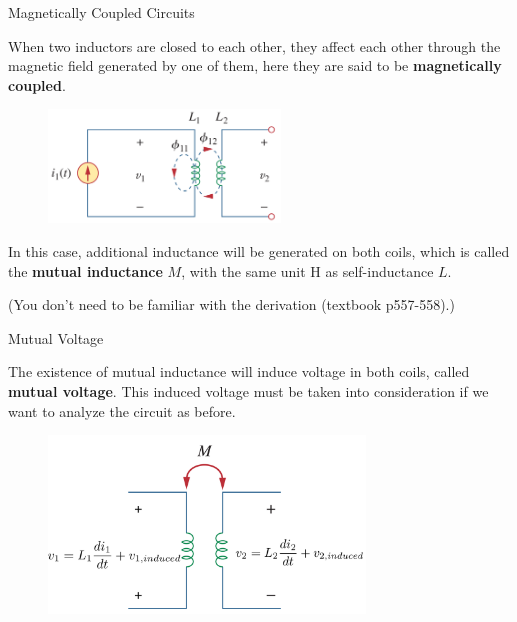 \documentclass{beamer}
\begin{document}
\begin{frame}{Magnetically Coupled Circuits}

When two inductors are closed to each other, they affect each other through the magnetic field generated by one of them, here they are said to be \textbf{magnetically coupled}.

\begin{figure}[H]
    \centering
    \includegraphics[width=0.55\textwidth]{C13/intro.png}
\end{figure}


In this case, additional inductance will be generated on both coils, which is called the \textbf{mutual inductance} $M$, with the same unit $\mathrm{H}$ as self-inductance $L$.

\begin{small}
    (You don't need to be familiar with the derivation (textbook p557-558).)   
\end{small}

\end{frame}


\begin{frame}{Mutual Voltage}
    
The existence of mutual inductance will induce voltage in both coils, called \textbf{mutual voltage}. This induced voltage must be taken into consideration if we want to analyze the circuit as before. 

\begin{figure}[H]
    \centering
    \includegraphics[width=0.75\textwidth]{C13/ill.png}
\end{figure}



\end{frame}
\end{document}
